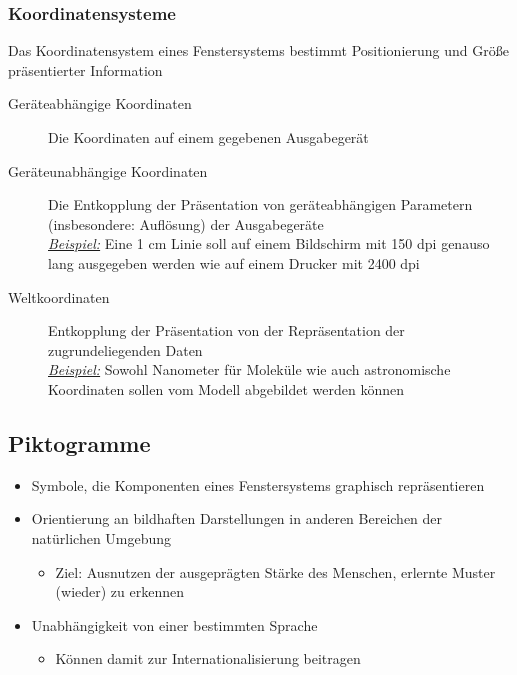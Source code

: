 \documentclass
[
	8pt,		%
	ngerman,	%
	a4paper,	%
	landscape,	%
	final		%
]{extarticle}
\newcommand{\example}{\textit{\underline{Beispiel:} }}
\begin{document}
\begin{multicols*}{4}
	\subsubsection{Koordinatensysteme}
	Das Koordinatensystem eines Fenstersystems bestimmt Positionierung und Größe
	präsentierter Information
	\begin{description}
		\item[Geräteabhängige Koordinaten] Die Koordinaten auf einem gegebenen
		      Ausgabegerät
		\item[Geräteunabhängige Koordinaten] Die Entkopplung der Präsentation
		      von geräteabhängigen Parametern (insbesondere: Auflösung) der
		      Ausgabegeräte \\
		      \example Eine 1 cm Linie soll auf einem Bildschirm mit 150 dpi
		      genauso lang ausgegeben werden wie auf einem Drucker mit 2400 dpi
		\item[Weltkoordinaten] Entkopplung der Präsentation von der
		      Repräsentation der zugrundeliegenden Daten \\
		      \example Sowohl Nanometer für Moleküle wie auch astronomische
		      Koordinaten sollen vom Modell abgebildet werden können
	\end{description}
	\subsection{Piktogramme}
	\begin{itemize}
		\item Symbole, die Komponenten eines Fenstersystems graphisch
		      repräsentieren
		\item Orientierung an bildhaften Darstellungen in anderen Bereichen der
		      natürlichen Umgebung
		      \begin{itemize}[nolistsep]
			      \item Ziel: Ausnutzen der ausgeprägten Stärke des Menschen,
			            erlernte Muster (wieder) zu erkennen
		      \end{itemize}
		\item Unabhängigkeit von einer bestimmten Sprache
		      \begin{itemize}[nolistsep]
			      \item Können damit zur Internationalisierung beitragen
		      \end{itemize}
	\end{itemize}

\end{multicols*}
\end{document}
